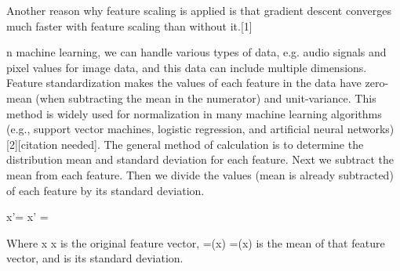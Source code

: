 Another reason why feature scaling is applied is that gradient descent converges much faster with feature scaling than without it.[1]

n machine learning, we can handle various types of data, e.g. audio signals and pixel values for image data, and this data can include multiple dimensions. Feature standardization makes the values of each feature in the data have zero-mean (when subtracting the mean in the numerator) and unit-variance. This method is widely used for normalization in many machine learning algorithms (e.g., support vector machines, logistic regression, and artificial neural networks)[2][citation needed]. The general method of calculation is to determine the distribution mean and standard deviation for each feature. Next we subtract the mean from each feature. Then we divide the values (mean is already subtracted) of each feature by its standard deviation.

{\displaystyle x'={}} x' = 

Where {\displaystyle x} x is the original feature vector, {={}(x)} {={}(x)} is the mean of that feature vector, and {\displaystyle \sigma } \sigma  is its standard deviation.
